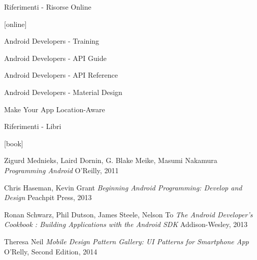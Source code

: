 
\begin{frame}{Riferimenti - Risorse Online}
\begin{thebibliography}{99}
[online]

 Android Developers - Training
\newblock {}

 Android Developers - API Guide
\newblock {}

 Android Developers - API Reference
\newblock {}

 Android Developers - Material Design
\newblock {}

 Make Your App Location-Aware
\newblock {}

\end{thebibliography}
\end{frame}


\begin{frame}{Riferimenti - Libri}
\begin{thebibliography}{99}
[book]

 Zigurd Mednieks, Laird Dornin, G. Blake Meike, Masumi Nakamura
\newblock \emph{Programming Android}
\newblock O'Reilly, 2011

 Chris Haseman, Kevin Grant
\newblock \emph{Beginning Android Programming: Develop and Design}
\newblock Peachpit Press, 2013

 Ronan Schwarz, Phil Dutson, James Steele, Nelson To
\newblock \emph{The Android Developer's Cookbook : Building Applications with the Android SDK}
\newblock Addison-Wesley, 2013 

 Theresa Neil
\newblock \emph{Mobile Design Pattern Gallery: UI Patterns for Smartphone App}
\newblock O'Relly, Second Edition, 2014
	
\end{thebibliography}
\end{frame}